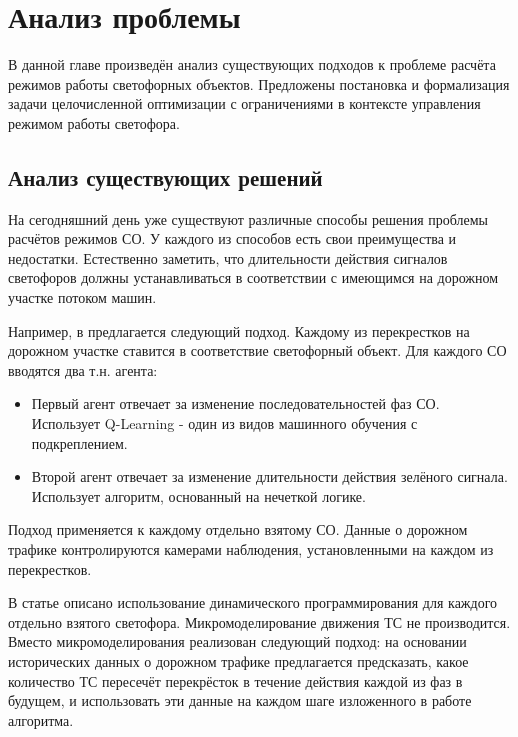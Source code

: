 \chapter{Анализ проблемы} \label{ch1}


В данной главе произведён анализ существующих подходов к проблеме расчёта режимов работы светофорных объектов. Предложены постановка и формализация задачи целочисленной оптимизации с ограничениями в контексте управления режимом работы светофора.
\section{Анализ существующих решений}
На сегодняшний день уже существуют различные способы решения проблемы расчётов режимов СО. У каждого из способов есть свои преимущества и недостатки. Естественно заметить, что длительности действия сигналов светофоров должны устанавливаться в соответствии с имеющимся на дорожном участке потоком машин.

Например, в \cite{fuzzy-logic} предлагается следующий подход. Каждому из перекрестков на дорожном участке ставится в соответствие светофорный объект. Для каждого СО вводятся два т.н. агента:
\begin{itemize}
	\item Первый агент отвечает за изменение последовательностей фаз СО. Использует Q-Learning \cite{Q-learning-ref} - один из видов машинного обучения с подкреплением.
	\item Второй агент отвечает за изменение длительности действия зелёного сигнала. Использует алгоритм, основанный на нечеткой логике.
\end{itemize}
Подход применяется к каждому отдельно взятому СО. Данные о дорожном трафике контролируются камерами наблюдения, установленными на каждом из перекрестков.

В статье \cite{dynamic-programming} описано использование динамического программирования для каждого отдельно взятого светофора. Микромоделирование движения ТС не производится.
Вместо микромоделирования реализован следующий подход: на основании исторических данных о дорожном трафике предлагается предсказать, какое количество ТС пересечёт перекрёсток в течение действия каждой из фаз в будущем, и использовать эти данные на каждом шаге изложенного в работе алгоритма.


